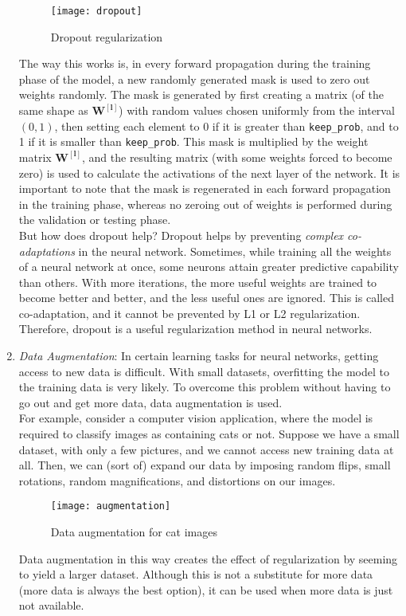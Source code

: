 \documentclass[a4paper, 12pt]{report}
\begin{document}
\begin{enumerate}
\begin{figure}[H]
\centering
\texttt{[image: dropout]}
\caption{Dropout regularization}
\end{figure}
The way this works is, in every forward propagation during the training phase of the model, a new randomly generated mask is used to zero out weights randomly. The mask is generated by first creating a matrix (of the same shape as $\bm{W^{[l]}}$) with random values chosen uniformly from the interval $\left(0, 1\right)$, then setting each element to 0 if it is greater than \texttt{keep\_prob}, and to 1 if it is smaller than \texttt{keep\_prob}. This mask is multiplied by the weight matrix $\bm{W^{[l]}}$, and the resulting matrix (with some weights forced to become zero) is used to calculate the activations of the next layer of the network. It is important to note that the mask is regenerated in each forward propagation in the training phase, whereas no zeroing out of weights is performed during the validation or testing phase.\\
\break
But how does dropout help? Dropout helps by preventing \textit{complex co-adaptations} in the neural network. Sometimes, while training all the weights of a neural network at once, some neurons attain greater predictive capability than others. With more iterations, the more useful weights are trained to become better and better, and the less useful ones are ignored. This is called co-adaptation, and it cannot be prevented by L1 or L2 regularization. Therefore, dropout is a useful regularization method in neural networks.
\item \textit{Data Augmentation}: In certain learning tasks for neural networks, getting access to new data is difficult. With small datasets, overfitting the model to the training data is very likely. To overcome this problem without having to go out and get more data, data augmentation is used.\\
\break
For example, consider a computer vision application, where the model is required to classify images as containing cats or not. Suppose we have a small dataset, with only a few pictures, and we cannot access new training data at all. Then, we can (sort of) expand our data by imposing random flips, small rotations, random magnifications, and distortions on our images.
\begin{figure}[H]
\centering
\texttt{[image: augmentation]}
\caption{Data augmentation for cat images}
\end{figure}
Data augmentation in this way creates the effect of regularization by seeming to yield a larger dataset. Although this is not a substitute for more data (more data is always the best option), it can be used when more data is just not available.
\end{enumerate}
\end{document}
